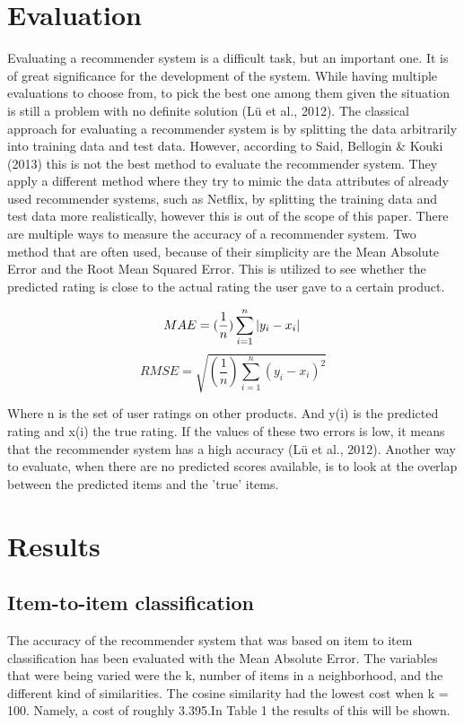 \documentclass[11pt]{article}
\begin{document}
\section{Evaluation}
Evaluating a recommender system is a difficult task, but an important one. It is of great significance for the development of the system. While having multiple evaluations to choose from, to pick the best one among them given the situation is still a problem with no definite solution (Lü et al., 2012).  The classical approach for evaluating a recommender system is by splitting the data arbitrarily into training data and test data. However, according to Said, Bellogin \& Kouki (2013) this is not the best method to evaluate the recommender system. They apply a different method where they try to mimic the data attributes of already used recommender systems, such as Netflix, by splitting the training data and test data more realistically, however this is out of the scope of this paper. There are multiple ways to measure the accuracy of a recommender system. Two method that are often used, because of their simplicity are the Mean Absolute Error and the Root Mean Squared Error. This is utilized to see whether the predicted rating is close to the actual rating the user gave to a certain product.


$$MAE =  (\frac{1}{n})\sum_{i=1}^{n}\left | y_{i} - x_{i} \right |\\ $$
$$RMSE=\sqrt{(\frac{1}{n})\sum_{i=1}^{n}(y_{i} - x_{i})^{2}} $$

Where n is the set of user ratings on other products. And y(i) is the predicted rating and x(i)  the true rating. 
If the values of these two errors is low, it means that the recommender system has a high accuracy (Lü et al., 2012). Another way to evaluate, when there are no predicted scores available, is to look at the overlap between the predicted items and the 'true' items.


\section{Results}
\subsection{Item-to-item classification}
The accuracy of the recommender system that was based on item to item classification has been evaluated with the Mean Absolute Error. The variables that were being varied were the k, number of items in a neighborhood, and the different kind of similarities. The cosine similarity had the lowest cost when k = 100. Namely, a cost of roughly 3.395.In Table 1 the results of this will be shown.
\end{document}
